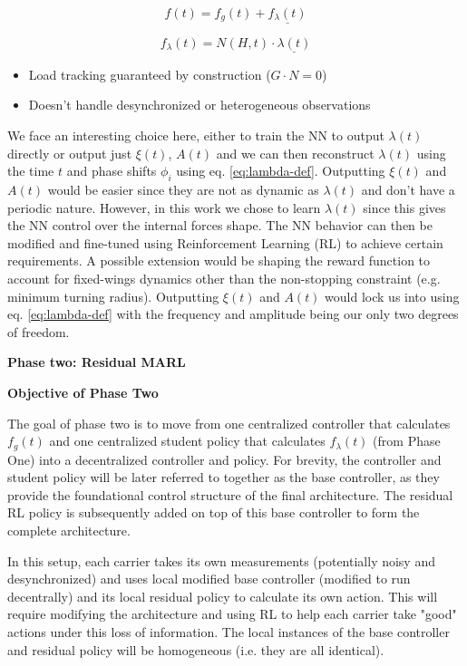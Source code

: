 \begin{equation}
  f(t) = f_g(t) + \underline{f_\lambda(t)}
  \label{eq:il-action-force}
\end{equation}

\begin{equation}
  f_\lambda(t) = N(H,t) \cdot \underline{\lambda(t)}
  \label{eq:il-nullspace-force}
\end{equation}

\begin{itemize}
  \item Load tracking guaranteed by construction ($G \cdot N = 0$)
  \item Doesn’t handle desynchronized or heterogeneous observations
\end{itemize}

We face
an interesting choice here, either to train the NN to output $\lambda(t)$
directly or output just $\xi(t)$, $A(t)$ and we can then reconstruct
$\lambda(t)$ using the time $t$ and phase shifts $\phi_i$ using eq.
\eqref{eq:lambda-def}. Outputting $\xi(t)$ and $A(t)$ would be easier
since they are not as dynamic as $\lambda(t)$ and don’t have a periodic
nature. However, in this work we chose to learn $\lambda(t)$ since this
gives the NN control over the internal forces shape. The NN behavior can
then be modified and fine-tuned using Reinforcement Learning (RL) to
achieve certain requirements. A possible extension would be shaping the
reward function to account for fixed-wings dynamics other than the
non-stopping constraint (e.g. minimum turning radius). Outputting
$\xi(t)$ and $A(t)$ would lock us into using eq. \eqref{eq:lambda-def}
with the frequency and amplitude being our only two degrees of freedom.

\noindent\textbf{Phase two:  Residual MARL}

\noindent\textbf{Objective of Phase Two}

The goal of phase two is to move from one centralized controller that 
calculates $f_g(t)$ and one centralized student policy that calculates 
$f_\lambda(t)$ (from Phase One) into a decentralized controller and policy. 
For brevity, the controller and student policy will be
later referred to together as the base controller, as they provide the 
foundational control structure of the final architecture. The residual RL 
policy is subsequently added on top of this base controller to form the 
complete architecture.

In this setup, each carrier takes its own measurements (potentially noisy and 
desynchronized) and uses local modified base controller (modified to run 
decentrally) and its local residual policy to calculate its own 
action. This will require modifying the architecture and using RL to help
each carrier take "good" actions under this loss of information. The local 
instances of the base controller and residual policy will be homogeneous 
(i.e. they are all identical).


